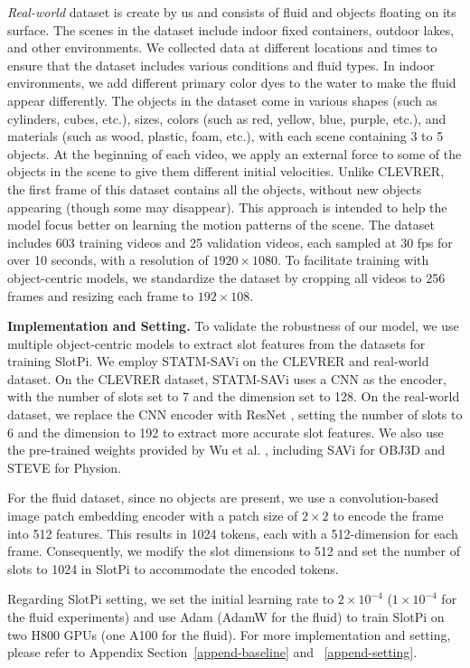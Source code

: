 \documentclass[sigconf]{acmart}
\begin{document}
\textit{Real-world} dataset is create by us and consists of fluid and objects floating on its surface. The scenes in the dataset include indoor fixed containers, outdoor lakes, and other environments. We collected data at different locations and times to ensure that the dataset includes various conditions and fluid types. In indoor environments, we add different primary color dyes to the water to make the fluid appear differently. The objects in the dataset come in various shapes (such as cylinders, cubes, etc.), sizes, colors (such as red, yellow, blue, purple, etc.), and materials (such as wood, plastic, foam, etc.), with each scene containing 3 to 5 objects. At the beginning of each video, we apply an external force to some of the objects in the scene to give them different initial velocities. Unlike CLEVRER, the first frame of this dataset contains all the objects, without new objects appearing (though some may disappear). This approach is intended to help the model focus better on learning the motion patterns of the scene. The dataset includes 603 training videos and 25 validation videos, each sampled at 30 fps for over 10 seconds, with a resolution of $1920\times1080$. To facilitate training with object-centric models, we standardize the dataset by cropping all videos to 256 frames and resizing each frame to $192\times108$.


\textbf{Implementation and Setting.} To validate the robustness of our model, we use multiple object-centric models to extract slot features from the datasets for training SlotPi. We employ STATM-SAVi on the CLEVRER and real-world dataset. On the CLEVRER dataset, STATM-SAVi uses a CNN as the encoder, with the number of slots set to 7 and the dimension set to 128. On the real-world dataset, we replace the CNN encoder with ResNet \cite{he2016deep}, setting the number of slots to 6 and the dimension to 192 to extract more accurate slot features. We also use the pre-trained weights provided by Wu et al. \cite{wu2023SlotFormer}, including SAVi \cite{kipf2021conditional} for OBJ3D and STEVE \cite{singh2022simple} for Physion. 

For the fluid dataset, since no objects are present, we use a convolution-based image patch embedding encoder with a patch size of $2\times2$ to encode the frame into 512 features. This results in 1024 tokens, each with a 512-dimension for each frame. Consequently, we modify the slot dimensions to 512 and set the number of slots to 1024 in SlotPi to accommodate the encoded tokens.

Regarding SlotPi setting, we set the initial learning rate to $2\times 10^{-4}$ ($1\times 10^{-4}$ for the fluid experiments) and use Adam (AdamW for the fluid) to train SlotPi on two H800 GPUs (one A100 for the fluid). For more implementation and setting, please refer to Appendix Section~\ref{append-baseline} and ~\ref{append-setting}. 
\end{document}
